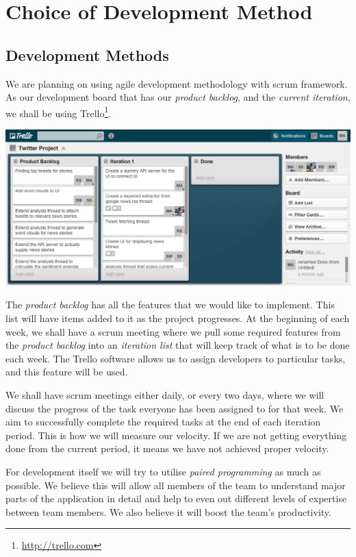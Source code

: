 \documentclass[a4paper,11pt]{article}
\begin{document}
	\section{Choice of Development Method}
		\subsection{Development Methods}
		
			We are planning on using agile development methodology with scrum framework. As our development board that has our \emph{product backlog}, and the \emph{current iteration}, we shall be using Trello\footnote{\url{http://trello.com}}.
			\begin{center}
			\includegraphics[scale=0.4]{trello.png}
		  \end{center}
	
			The \emph{product backlog} has all the features that we would like to implement. This list will have items added to it as the project progresses. At the beginning of each week, we shall have a scrum meeting where we pull some required features from the \emph{product backlog} into an \emph{iteration list} that will keep track of what is to be done each week. The Trello software allows us to assign developers to particular tasks, and this feature will be used.
			
			We shall have scrum meetings either daily, or every two days, where we will discuss the progress of the task everyone has been assigned to for that week. We aim to successfully complete the required tasks at the end of each iteration period. This is how we will measure our velocity. If we are not getting everything done from the current period, it means we have not achieved proper velocity.
			
			For development itself we will try to utilise \emph{paired programming} as much as possible. We believe this will allow all members of the team to understand major parts of the application in detail and help to even out different levels of expertise between team members. We also believe it will boost the team's productivity.
	
\end{document}
